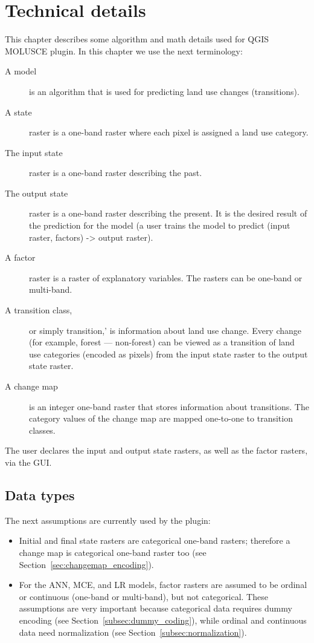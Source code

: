 \documentclass{report}
\begin{document}
\chapter{Technical details}
This chapter describes some algorithm and math details used for QGIS MOLUSCE plugin.
In this chapter we use the next terminology:
\begin{description}
\item[A model] is an algorithm that is used for predicting land use changes (transitions).
\item[A state] raster is a one-band raster where each pixel is assigned a land use category.
\item[The input state] raster is a one-band raster describing the past.
\item[The output state] raster is a one-band raster describing the present. It is the desired result of the prediction for the model (a user trains the model to predict (input raster, factors) -> output raster).
\item[A factor] raster is a raster of explanatory variables. The rasters can be one-band or multi-band.
\item[A transition class,] or simply transition,' is information about land use change.
  Every change (for example, forest --- non-forest) can be viewed as a transition of land use categories (encoded as pixels) from the input state raster to the output state raster.
\item[A change map] is an integer one-band raster that stores information about transitions.
  The category values of the change map are mapped one-to-one to transition classes.
\end{description}

The user declares the input and output state rasters, as well as the factor rasters, via the GUI.

\section{Data types}

The next assumptions are currently used by the plugin:
\begin{itemize}
    \item Initial and final state rasters are categorical one-band rasters; therefore a change map is categorical one-band raster too (see Section~\ref{sec:changemap_encoding}).
    \item For the ANN, MCE, and LR models, factor rasters are assumed to be ordinal or continuous (one-band or multi-band), but not categorical.
      These assumptions are very important because categorical data requires dummy encoding (see Section~\ref{subsec:dummy_coding}),
      while ordinal and continuous data need normalization (see Section~\ref{subsec:normalization}).
\end{itemize}
    
\end{document}
